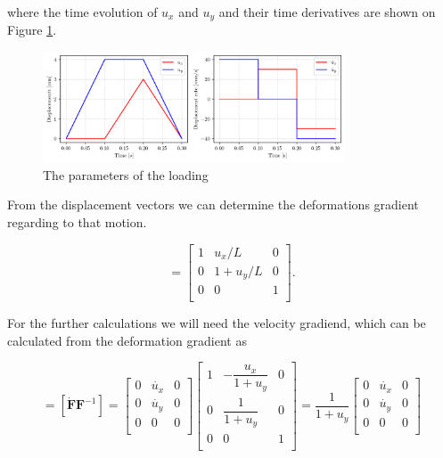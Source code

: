 \documentclass[12pt,a4paper]{article}
\begin{document}
where the time evolution of $u_x$ and $u_y$ and their time derivatives are shown on Figure \ref{fig:displacements}.

\begin{figure}[h]
    \centering
    \includegraphics[width=0.8\textwidth]{figures/loading.png}
    \caption{The parameters of the loading}
    \label{fig:displacements}
\end{figure}

From the displacement vectors we can determine the deformations gradient regarding to that motion.

\begin{equation}
    [F] = 
        \begin{bmatrix}
            1 & u_x/L & 0 \\
            0 & 1+u_y/L & 0 \\
            0 & 0 & 1 \\
        \end{bmatrix}.
\end{equation}

\newpage

For the further calculations we will need the velocity gradiend, which can be calculated from the deformation gradient as

\begin{equation}
    [\boldsymbol{l}] = [\dot{\boldsymbol{F}}\boldsymbol{F}^{-1}] = 
        \begin{bmatrix}
            0 & \dot{u_x} & 0 \\
            0 & \dot{u_y} & 0 \\
            0 & 0 & 0 \\
        \end{bmatrix}
        \begin{bmatrix}
            1 & -\dfrac{u_x}{1 + u_y} & 0 \\
            0 & \dfrac{1}{1 + u_y} & 0 \\
            0 & 0 & 1 \\
        \end{bmatrix}
        =
        \dfrac{1}{1 + u_y}
        \begin{bmatrix}
            0 & \dot{u_x} & 0 \\
            0 & \dot{u_y} & 0 \\
            0 & 0 & 0 \\
    \end{bmatrix}
\end{equation}
\end{document}
